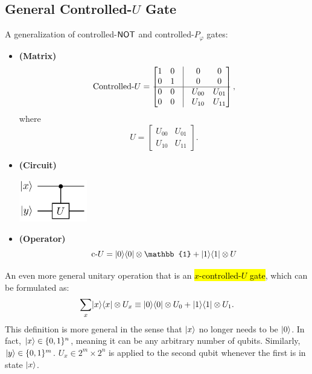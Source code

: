 \documentclass[12pt]{article}
\begin{document}
\begin{definition}
\subsection{General Controlled-$U$ Gate}
A generalization of controlled-$\NOT$ and controlled-$P_\varphi$ gates:
\begin{itemize}
    \item \textbf{(Matrix)} $$
    \text{Controlled-}U = \begin{bmatrix}
        1 & 0 & \vline & 0 & 0 \\
        0 & 1 & \vline & 0 & 0 \\
        \hline
        0 & 0 & \vline & U_{00} & U_{01} \\
        0 & 0 & \vline & U_{10} & U_{11} \\
    \end{bmatrix},
    $$ where $$
    U = \begin{bmatrix}
    U_{00} & U_{01} \\
    U_{10} & U_{11}
    \end{bmatrix}.
    $$
    \item \textbf{(Circuit)}
    \begin{center}
        \includegraphics[width = 8em]{images/9.jpg}
    \end{center}
    \item \textbf{(Operator)} $$
    \text{c-}U = \kb{0}{0}\otimes \mathbb{1} + \kb{1}{1}\otimes U
    $$
\end{itemize}
\end{definition}

\begin{definition}
An even more general unitary operation that is an \hl{$x$-controlled-$U$ gate}, which can be formulated as: $$
\underset{x}{\sum}\kb{x}{x}\otimes U_x \equiv \kb{0}{0}\otimes U_0 + \kb{1}{1}\otimes U_1.
$$ This definition is more general in the sense that $\Ket{x}$ no longer needs to be $\Ket{0}$. In fact, $\Ket{x}\in \{0,1\}^n$, meaning it can be any arbitrary number of qubits. Similarly, $\Ket{y}\in \{0,1\}^m$. $U_x\in 2^m\times 2^n$ is applied to the second qubit whenever the first is in state $\Ket{x}$.
\end{definition}
\end{document}
